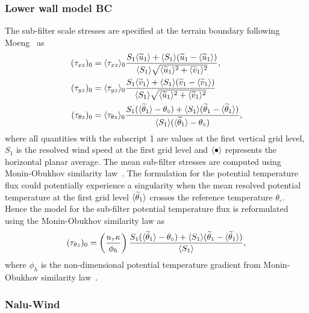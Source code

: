 \subsubsection{\label{sec:wallmodelBC}Lower wall model BC}
The sub-filter scale stresses are specified at the terrain boundary following
Moeng~\cite{Moeng1984} as
\begin{align}
 (\tau_{xz})_0 &= \langle \tau_{xz} \rangle_0 \frac{S_1 \langle \widetilde{u}_1 \rangle + \langle S_1 \rangle (\widetilde{u}_1 - \langle \widetilde{u}_1 \rangle ) }{ \langle S_1 \rangle \sqrt{\langle \widetilde{u}_1 \rangle^2 + \langle \widetilde{v}_1 \rangle^2 } } , \\
 (\tau_{yz})_0 &= \langle \tau_{yz} \rangle_0 \frac{S_1 \langle \widetilde{v}_1 \rangle + \langle S_1 \rangle (\widetilde{v}_1 - \langle \widetilde{v}_1 \rangle ) }{ \langle S_1 \rangle \sqrt{\langle \widetilde{u}_1 \rangle^2 + \langle \widetilde{v}_1 \rangle^2 } } \\
  (\tau_{\theta z})_0 &= \langle \tau_{\theta z} \rangle_0 \frac{S_1 ( \langle \widetilde{\theta}_1 \rangle - \theta_{\circ} ) + \langle S_1 \rangle (\widetilde{\theta}_1 - \langle \widetilde{\theta}_1 \rangle ) }{ \langle S_1 \rangle ( \langle \widetilde{\theta}_1 \rangle - \theta_{\circ} ) },
\end{align}
where all quantities with the subscript 1 are values at the first vertical grid
level, $S_1$ is the resolved wind speed at the first grid level and
$\langle \bullet \rangle$ represents the horizontal planar average. The mean
sub-filter stresses are computed using Monin-Obukhov similarity
law~\cite{Etling1996}. The formulation for the potential temperature flux could
potentially experience a singularity when the mean resolved potential
temperature at the first grid level $\langle \widetilde{\theta}_1 \rangle$ crosses the
reference temperature $\theta_{\circ}$. Hence the model for the sub-filter
potential temperature flux is reformulated using the Monin-Obukhov similarity
law as
\begin{equation}
(\tau_{\theta z})_0 = \left ( \frac{u_{\tau} \kappa}{ \phi_h} \right ) \frac{S_1 ( \langle \widetilde{\theta}_1 \rangle - \theta_{\circ} ) + \langle S_1 \rangle (\widetilde{\theta}_1 - \langle \widetilde{\theta}_1 \rangle ) }{ \langle S_1 \rangle },
\end{equation}
where $\phi_h$ is the non-dimensional potential temperature gradient from
Monin-Obukhov similarity law~\cite{Etling1996}.


\subsubsection{Nalu-Wind}

